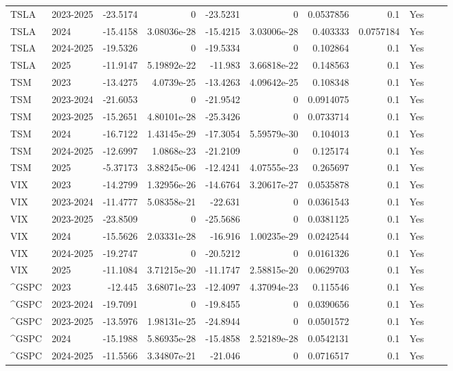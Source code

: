 \begin{longtable}{llrrrrrrrrl}
TSLA & 2023-2025 & -23.5174 & 0 & -23.5231 & 0 & 0.0537856 & 0.1 & Yes &  \\
TSLA & 2024 & -15.4158 & 3.08036e-28 & -15.4215 & 3.03006e-28 & 0.403333 & 0.0757184 & Yes &  \\
TSLA & 2024-2025 & -19.5326 & 0 & -19.5334 & 0 & 0.102864 & 0.1 & Yes &  \\
TSLA & 2025 & -11.9147 & 5.19892e-22 & -11.983 & 3.66818e-22 & 0.148563 & 0.1 & Yes &  \\
TSM & 2023 & -13.4275 & 4.0739e-25 & -13.4263 & 4.09642e-25 & 0.108348 & 0.1 & Yes &  \\
TSM & 2023-2024 & -21.6053 & 0 & -21.9542 & 0 & 0.0914075 & 0.1 & Yes &  \\
TSM & 2023-2025 & -15.2651 & 4.80101e-28 & -25.3426 & 0 & 0.0733714 & 0.1 & Yes &  \\
TSM & 2024 & -16.7122 & 1.43145e-29 & -17.3054 & 5.59579e-30 & 0.104013 & 0.1 & Yes &  \\
TSM & 2024-2025 & -12.6997 & 1.0868e-23 & -21.2109 & 0 & 0.125174 & 0.1 & Yes &  \\
TSM & 2025 & -5.37173 & 3.88245e-06 & -12.4241 & 4.07555e-23 & 0.265697 & 0.1 & Yes &  \\
VIX & 2023 & -14.2799 & 1.32956e-26 & -14.6764 & 3.20617e-27 & 0.0535878 & 0.1 & Yes &  \\
VIX & 2023-2024 & -11.4777 & 5.08358e-21 & -22.631 & 0 & 0.0361543 & 0.1 & Yes &  \\
VIX & 2023-2025 & -23.8509 & 0 & -25.5686 & 0 & 0.0381125 & 0.1 & Yes &  \\
VIX & 2024 & -15.5626 & 2.03331e-28 & -16.916 & 1.00235e-29 & 0.0242544 & 0.1 & Yes &  \\
VIX & 2024-2025 & -19.2747 & 0 & -20.5212 & 0 & 0.0161326 & 0.1 & Yes &  \\
VIX & 2025 & -11.1084 & 3.71215e-20 & -11.1747 & 2.58815e-20 & 0.0629703 & 0.1 & Yes &  \\
\textasciicircum{}GSPC & 2023 & -12.445 & 3.68071e-23 & -12.4097 & 4.37094e-23 & 0.115546 & 0.1 & Yes &  \\
\textasciicircum{}GSPC & 2023-2024 & -19.7091 & 0 & -19.8455 & 0 & 0.0390656 & 0.1 & Yes &  \\
\textasciicircum{}GSPC & 2023-2025 & -13.5976 & 1.98131e-25 & -24.8944 & 0 & 0.0501572 & 0.1 & Yes &  \\
\textasciicircum{}GSPC & 2024 & -15.1988 & 5.86935e-28 & -15.4858 & 2.52189e-28 & 0.0542131 & 0.1 & Yes &  \\
\textasciicircum{}GSPC & 2024-2025 & -11.5566 & 3.34807e-21 & -21.046 & 0 & 0.0716517 & 0.1 & Yes &  \\

\end{longtable}
